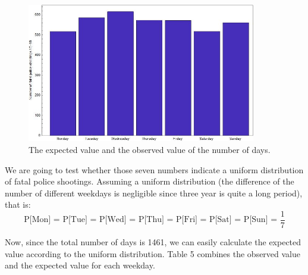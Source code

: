 \documentclass[a4paper]{article}
\begin{document}
{{\begin{figure}[h]
    \centering
\includegraphics[width = 10cm]{1}
     \caption{The expected value and the observed value of the number of days.}
    \label{f1}
\end{figure}
We are going to test whether those seven numbers indicate a uniform distribution of fatal police shootings. Assuming a uniform distribution (the difference of the number of different weekdays is negligible since three year is quite a long period), that is:
\begin{equation}
    \textrm{P[Mon] = P[Tue] = P[Wed] = P[Thu] = P[Fri] = P[Sat] = P[Sun] = }\frac{1}{7}
\end{equation} 
\par{Now, since the total number of days is 1461, we can easily calculate the expected value according to the uniform distribution. Table 5 combines the observed value and the expected value for each weekday.}

}}
\end{document}
